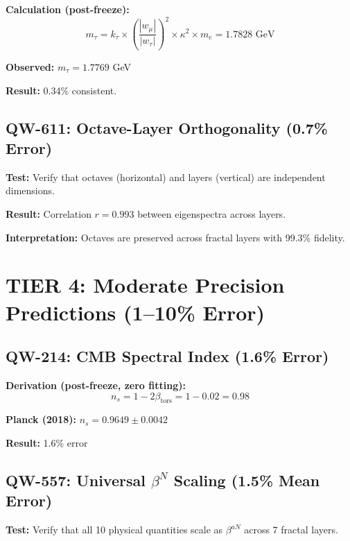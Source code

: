 \documentclass[11pt,a4paper]{book}
\theoremstyle{remark}
\newcommand{\betators}{\beta_{\text{tors}}}
\begin{document}
\textbf{Calculation (post-freeze):}
\begin{equation}
m_\tau = k_\tau \times \left(\frac{|w_\mu|}{|w_\tau|}\right)^2 \times \kappa^2 \times m_e = 1.7828 \text{ GeV}
\end{equation}

\textbf{Observed:} $m_\tau = 1.7769$ GeV

\textbf{Result:} 0.34\% consistent.

\subsection{QW-611: Octave-Layer Orthogonality (0.7\% Error)}

\textbf{Test:} Verify that octaves (horizontal) and layers (vertical) are independent dimensions.

\textbf{Result:} Correlation $r = 0.993$ between eigenspectra across layers.

\textbf{Interpretation:} Octaves are preserved across fractal layers with 99.3\% fidelity.

\section{TIER 4: Moderate Precision Predictions (1--10\% Error)}

\subsection{QW-214: CMB Spectral Index (1.6\% Error)}

\textbf{Derivation (post-freeze, zero fitting):}
\begin{equation}
n_s = 1 - 2\betators = 1 - 0.02 = 0.98
\end{equation}

\textbf{Planck (2018):} $n_s = 0.9649 \pm 0.0042$

\textbf{Result:} 1.6\% error

\subsection{QW-557: Universal $\beta^N$ Scaling (1.5\% Mean Error)}

\textbf{Test:} Verify that all 10 physical quantities scale as $\beta^{aN}$ across 7 fractal layers.
\end{document}
